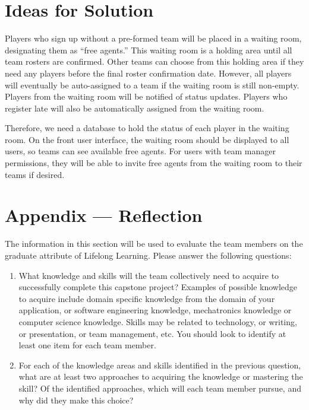 \documentclass[12pt]{article}
\begin{document}
\section{Ideas for Solution}
Players who sign up without a pre-formed team will be placed in a waiting room, designating them as “free agents.” This waiting room is a holding area until all team rosters are confirmed. Other teams can choose from this holding area if they need any players before the final roster confirmation date. However, all players will eventually be auto-assigned to a team if the waiting room is still non-empty. Players from the waiting room will be notified of status updates. Players who register late will also be automatically assigned from the waiting room.

Therefore, we need a database to hold the status of each player in the waiting room. On the front user interface, the waiting room should be displayed to all users, so teams can see available free agents. For users with team manager permissions, they will be able to invite free agents from the waiting room to their teams if desired.


\newpage{}
\section*{Appendix --- Reflection}

The information in this section will be used to evaluate the team members on the
graduate attribute of Lifelong Learning.  Please answer the following questions:

\begin{enumerate}
  \item What knowledge and skills will the team collectively need to acquire to
  successfully complete this capstone project?  Examples of possible knowledge
  to acquire include domain specific knowledge from the domain of your
  application, or software engineering knowledge, mechatronics knowledge or
  computer science knowledge.  Skills may be related to technology, or writing,
  or presentation, or team management, etc.  You should look to identify at
  least one item for each team member.
  \item For each of the knowledge areas and skills identified in the previous
  question, what are at least two approaches to acquiring the knowledge or
  mastering the skill?  Of the identified approaches, which will each team
  member pursue, and why did they make this choice?
\end{enumerate}
\end{document}
